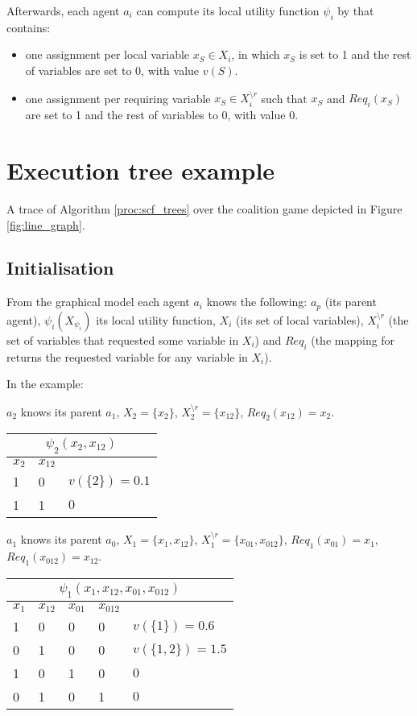 \documentclass{article}
\begin{document}
Afterwards, each agent $a_i$ can compute its local utility function $\psi_i$ by
that contains:
\begin{itemize}
 \item one assignment per local variable $x_S\in X_i$, in which $x_S$ is set to
 1 and the rest of variables are set to 0, with value $v(S)$.
 \item one assignment per requiring variable $x_{S}\in X^{\setminus r}_i$ such
 that $x_S$ and $Req_i(x_S)$ are set to 1 and the rest of variables to 0, with
 value 0.
\end{itemize}
\section{Execution tree example}
A trace of Algorithm \ref{proc:scf_trees} over the coalition game depicted in 
Figure \ref{fig:line_graph}.
\subsection{Initialisation}

From the graphical model each agent $a_i$ knows the following: $a_p$ (its parent
agent), $\psi_i(X_{\psi_i})$ its local utility function, $X_i$ (its set of local
variables), $X^{\setminus r}_i$ (the set of variables that requested some
variable in $X_i$) and $Req_i$ (the mapping for returns the requested variable
for any variable in $X_i$).


\noindent In the example:

\noindent $a_2$ knows its parent $a_1$, $X_2=\{x_2\}$, $X^{\setminus
r}_2=\{x_{12}\}$, $Req_2(x_{12})=x_2$.


\noindent\begin{tabular}{ | l | l |  l | }
\multicolumn{3}{c}{$\psi_2(x_{2},x_{12})$}  \\
\hline
	$x_{2}$ &	$x_{12}$ &  \\
\hline
	1	 &		0	 &	$v(\{2\})=0.1$  \\
	1	 &		1	 &	$0$ \\
\hline
\end{tabular}

\noindent $a_1$ knows its parent $a_0$, $X_1=\{x_1,x_{12}\}$,
$X^{\setminus r}_1=\{x_{01},x_{012}\}$, $Req_1(x_{01})=x_1$,
$Req_1(x_{012})=x_{12}$.


\noindent\begin{tabular}{ | l | l |  l | l | l |}
\multicolumn{5}{c}{$\psi_1(x_{1},x_{12},x_{01},x_{012})$}  \\
\hline
	$x_{1}$ &	$x_{12}$ & $x_{01}$ & $x_{012}$ &  \\
\hline
	1	 &		0	 &  0	&  0 & $v(\{1\})= 0.6$  \\
	0	 &		1	 &	0 	&  0 & $v(\{1,2\})=1.5$ \\
	1	 &		0	 &  1	&  0 & $0$  \\
	0	 &		1	 &	0 	&  1 & $0$ \\
\hline
\end{tabular}
\end{document}
